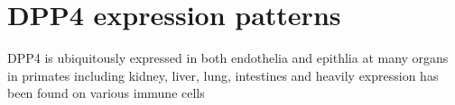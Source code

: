 \section{DPP4 expression patterns}
DPP4 is ubiquitously expressed in both endothelia and epithlia at many organs in primates including kidney, liver, lung, intestines and heavily expression has been found on various immune cells